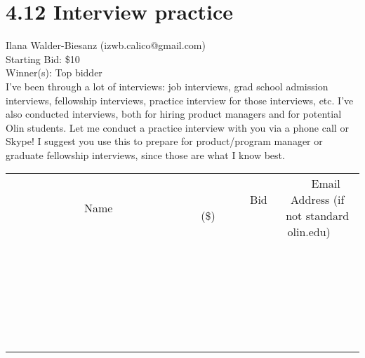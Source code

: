 \documentclass[11pt]{article}
\begin{document}
\section*{4.12 Interview practice}
Ilana Walder-Biesanz (izwb.calico@gmail.com) \\
Starting Bid: \$10 \\
Winner(s): 
Top bidder \\
I've been through a lot of interviews: job interviews, grad school admission interviews, fellowship interviews, practice interview for those interviews, etc. I've also conducted interviews, both for hiring product managers and for potential Olin students. Let me conduct a practice interview with you via a phone call or Skype! I suggest you use this to prepare for product/program manager or graduate fellowship interviews, since those are what I know best. \\[6ex]
\begin{tabular}{c c c}
~~~~~~~~~~~~~Name~~~~~~~~~~~~~ & ~~~~~~~~~Bid (\$)~~~~~~~~~ & ~~~Email Address (if not standard olin.edu)~~~ \\
 & & \\
\hline
 & & \\
\hline
 & & \\
\hline
 & & \\
\hline
 & & \\
\hline
 & & \\
\hline
 & & \\
\hline
 & & \\
\hline
 & & \\
\hline
 & & \\
\hline
 & & \\
\hline
 & & \\
\hline
 & & \\
\hline
 & & \\
\hline
 & & \\
\hline
 & & \\
\hline
 & & \\
\hline
 & & \\
\hline
 & & \\
\hline
 & & \\
\hline
 & & \\
\hline
 & & \\
\hline
 & & \\
\hline
 & & \\
\hline
 & & \\
\hline
 & & \\
\hline
\end{tabular}
\clearpage
\end{document}
